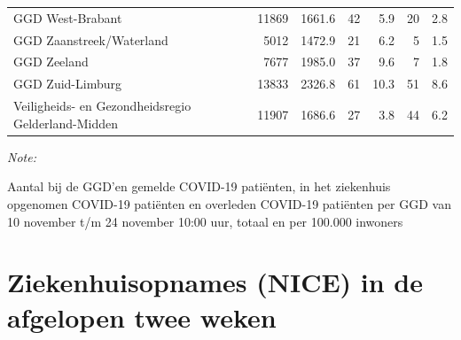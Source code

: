\documentclass[
  english,
  man,floatsintext]{apa6}
\begin{document}
\begin{table}
\begin{threeparttable}
\begin{tabular}{lrrrrrr}
GGD West-Brabant & 11869 & 1661.6 & 42 & 5.9 & 20 & 2.8\\
GGD Zaanstreek/Waterland & 5012 & 1472.9 & 21 & 6.2 & 5 & 1.5\\
GGD Zeeland & 7677 & 1985.0 & 37 & 9.6 & 7 & 1.8\\
GGD Zuid-Limburg & 13833 & 2326.8 & 61 & 10.3 & 51 & 8.6\\
Veiligheids- en Gezondheidsregio Gelderland-Midden & 11907 & 1686.6 & 27 & 3.8 & 44 & 6.2\\
\bottomrule
\end{tabular}
\begin{tablenotes}
\item \textit{Note: } 
\item Aantal bij de GGD’en gemelde COVID-19 patiënten, in het ziekenhuis opgenomen COVID-19 patiënten en overleden COVID-19 patiënten per GGD van 10 november t/m 24 november 10:00 uur, totaal en per 100.000 inwoners
\end{tablenotes}
\end{threeparttable}
\endgroup{}
\end{table}

\newpage

\hypertarget{ziekenhuisopnames-nice-in-de-afgelopen-twee-weken}{%
\section{Ziekenhuisopnames (NICE) in de afgelopen twee weken}\label{ziekenhuisopnames-nice-in-de-afgelopen-twee-weken}}
\end{document}
